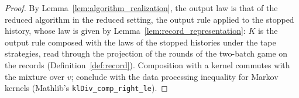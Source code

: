 \begin{proof}
  \leanok
  By Lemma~\ref{lem:algorithm_realization}, the output law is that of the reduced algorithm in the
  reduced setting, the output rule applied to the stopped history, whose law is given by
  Lemma~\ref{lem:record_representation}: $K$ is the output rule composed with the laws of the
  stopped histories under the tape strategies, read through the projection of the rounds of the
  two-batch game on the records (Definition~\ref{def:record}). Composition with a kernel commutes
  with the mixture over $v$; conclude with the data processing inequality for Markov kernels
  (Mathlib's \texttt{klDiv\_comp\_right\_le}).
\end{proof}
